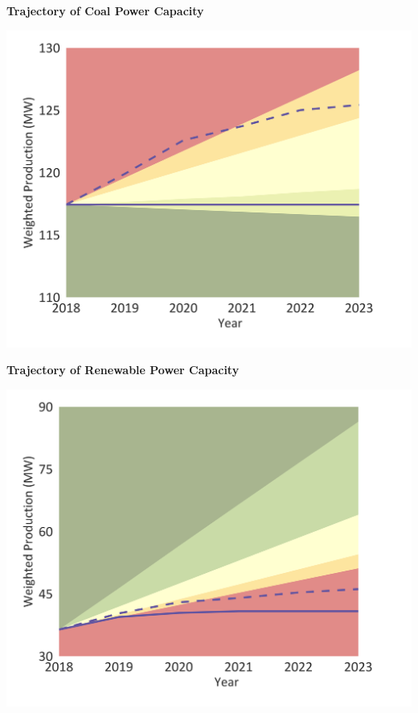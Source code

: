 \documentclass[10pt,table,a4]{article}\usepackage[]{graphicx}\usepackage[]{color}
\begin{document}
	\begin{minipage}[t]{.49\linewidth}
		\textbf{Trajectory of Coal Power Capacity }
		
		\includegraphics[trim = {0 0cm 0 0},width=1\linewidth]{CAFigures/Fig07}
		
		\textbf{Trajectory of Renewable Power Capacity }
		
		\includegraphics[trim = {0 0cm 0 0},width=.99\linewidth]{CAFigures/Fig08}
	\end{minipage}	
	\hspace{.02\linewidth}
\end{document}
